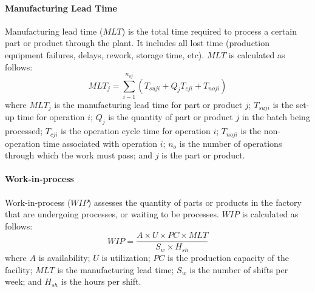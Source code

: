 \paragraph{Manufacturing Lead Time}
Manufacturing lead time ($MLT$) is the total time required to process a certain part or product through the plant. It includes all lost time (production equipment failures, delays, rework, storage time, etc). $MLT$ is calculated as follows:
\begin{equation}
MLT_j=\sum\limits_{i-1}^{n_{oj}}(T_{suji}+Q_{j}T_{cji}+T_{noji})
\end{equation}
where $MLT_j$ is the manufacturing lead time for part or product $j$; $T_{suji}$ is the set-up time for operation $i$; $Q_j$ is the quantity of part or product $j$ in the batch being processed; $T_{cji}$ is the operation cycle time for operation $i$; $T_{noji}$ is the non-operation time associated with operation $i$; $n_o$ is the number of operations through which the work must pass; and $j$ is the part or product.

\paragraph{Work-in-process}
Work-in-process ($WIP$) assesses the quantity of parts or products in the factory that are undergoing processes, or waiting to be processes. $WIP$ is calculated as follows:
\begin{equation}
WIP=\frac{A\times U\times PC\times MLT}{S_w\times H_{sh}}
\end{equation}
where $A$ is availability; $U$ is utilization; $PC$ is the production capacity of the facility; $MLT$ is the manufacturing lead time; $S_w$ is the number of shifts per week; and $H_{sh}$ is the hours per shift.






